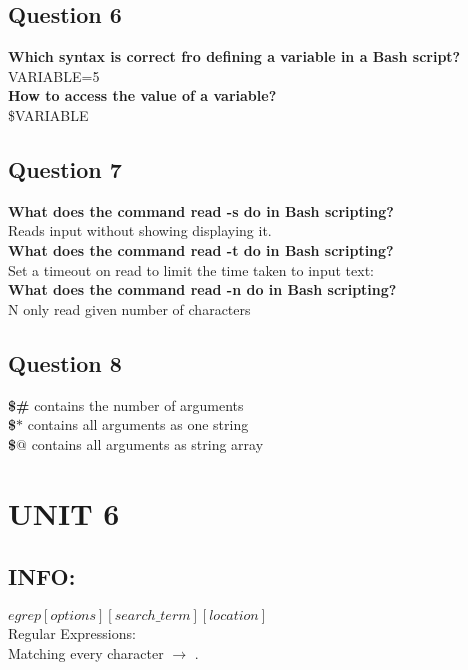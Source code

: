 \documentclass[11pt,parskip]{scrartcl}
\begin{document}
\subsection*{Question 6}
\textbf{Which syntax is correct fro defining a variable in a Bash script?} \\
VARIABLE=5 \\
\textbf{How to access the value of a variable?} \\
\$VARIABLE

\subsection*{Question 7} 
\textbf{What does the command read -s do in Bash scripting?} \\
Reads input without showing displaying it. \\
\textbf{What does the command read -t do in Bash scripting?} \\
Set a timeout on read to limit the time taken to input text: \\
\textbf{What does the command read -n do in Bash scripting?} \\
N only read given number of characters

\subsection*{Question 8}
\textbf{\$\#} contains the number of arguments \\
\textbf{\$}$*$ contains all arguments as one string \\
\textbf{\$}$@$ contains all arguments as string array

\section*{UNIT 6}
\subsection*{INFO:}
$egrep [options] [search\_term] [location]$ \\

Regular Expressions: \\
Matching every character $\rightarrow$ . \\
\end{document}
